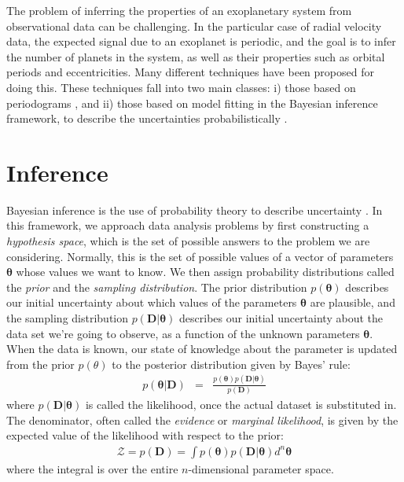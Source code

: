 \documentclass[useAMS,usenatbib]{mn2e}
\renewcommand{\btheta}{\boldsymbol{\theta}}
\newcommand{\bdata}{\boldsymbol{D}}
\begin{document}
The problem of inferring the properties of an
exoplanetary system from observational data can be challenging.
In the particular case of radial velocity data,
the expected signal due to an exoplanet is periodic, and the goal is to
infer the number of planets in the system, as well as their properties such
as orbital periods and eccentricities. Many
different techniques have been proposed for doing this.
These techniques fall into two main
classes: i) those based on periodograms \citep[e.g.][]{2009A&A...496..577Z},
and ii) those based on model fitting in the Bayesian inference framework,
to describe the uncertainties probabilistically
\citep[e.g.][]{2011MNRAS.410...94G, 2014MNRAS.437.3540F,
2011A&A...528L...5T, fengji}.

\section{Inference}
Bayesian inference is the use of probability theory to describe uncertainty
\citep{sivia, ohagan}. In this framework, we approach data analysis problems by first
constructing a {\it hypothesis space}, which is the set of possible answers
to the problem we are considering. Normally, this is the set of possible
values of a vector of parameters $\btheta$ whose values we want
to know. We then assign probability distributions
called the {\it prior} and the {\it sampling distribution}. The prior
distribution $p(\btheta)$ describes
our initial uncertainty about which values of the parameters
$\btheta$ are plausible, and the
sampling distribution $p(\bdata | \btheta)$ describes
our initial uncertainty about the data set we're going to observe, as a
function of the unknown parameters $\btheta$.
When the data is known, our state of knowledge about the parameter is
updated from the prior $p(\theta)$ to the posterior distribution given by
Bayes' rule:
\begin{eqnarray}
p(\btheta | \bdata) &=&
\frac{p(\btheta)p(\bdata | \btheta)}
{p(\bdata)}
\end{eqnarray}
where $p(\bdata | \btheta)$ is called the likelihood, once the actual dataset
is substituted in.
The denominator, often called the {\it evidence} or
{\it marginal likelihood}, is given by the expected value of the likelihood
with respect to the prior:
\begin{eqnarray}
\mathcal{Z} = p(\bdata) = \int p(\btheta) p(\bdata | \btheta) d^n \btheta
\end{eqnarray}
where the integral is over the entire $n$-dimensional parameter space.
\end{document}
